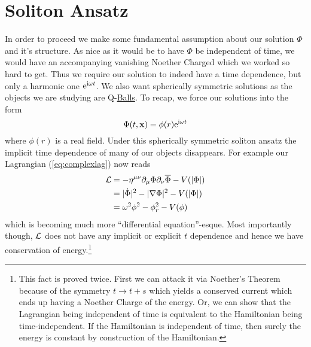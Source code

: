 \section{Soliton Ansatz}\label{sec:solitonans}
In order to proceed we make some fundamental assumption about our solution $\Phi$ and it's structure. As nice as it would be to have $\Phi$ be independent of time, we would have an accompanying vanishing Noether Charged which we worked so hard to get. Thus we require our solution to indeed have a time dependence, but only a harmonic one $\mathrm{e}^{\mathrm{i}\omega t}$. We also want spherically symmetric solutions as the objects we are studying are Q-\underline{Balls}. To recap, we force our solutions into the form
\begin{equation}\label{eq:solitonansatz}
\Phi(t, \mathbf{x}) = \phi(r)\mathrm{e}^{\mathrm{i}\omega t}
\end{equation}
where $\phi(r)$ is a real field. Under this spherically symmetric soliton ansatz the implicit time dependence of many of our objects disappears. For example our Lagrangian (\ref{eq:complexlag}) now reads
\begin{align}
\mathcal{L} & = -\eta^{\mu\nu}\partial_\mu\Phi\partial_\nu\overline{\Phi} - V(|\Phi|) \\
 & = |\dot{\Phi}|^2 - |\nabla\Phi|^2 - V(|\Phi|) \\
 & = \omega^2\phi^2 - \phi_r^2 - V(\phi)
\end{align}
which is becoming much more ``differential equation''-esque. Most importantly though, $\mathcal{L}$ does not have any implicit or explicit $t$ dependence and hence we have conservation of energy.\footnote{This fact is proved twice. First we can attack it via Noether's Theorem because of the symmetry $t\to t + s$ which yields a conserved current which ends up having a Noether Charge of the energy. Or, we can show that the Lagrangian being independent of time is equivalent to the Hamiltonian being time-independent. If the Hamiltonian is independent of time, then surely the energy is constant by construction of the Hamiltonian.}

